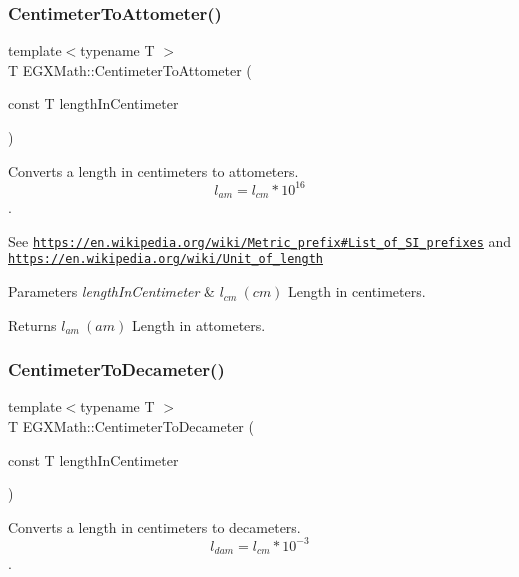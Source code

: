 \subsubsection{\texorpdfstring{Centimeter\+To\+Attometer()}{CentimeterToAttometer()}}
{\footnotesize\ttfamily template$<$typename T $>$ \\
T E\+G\+X\+Math\+::\+Centimeter\+To\+Attometer (\begin{DoxyParamCaption}\item[{const T}]{length\+In\+Centimeter }\end{DoxyParamCaption})}



Converts a length in centimeters to attometers. \[ l_{am}=l_{cm} * 10^{16} \]. 

See \href{https://en.wikipedia.org/wiki/Metric_prefix#List_of_SI_prefixes}{\tt https\+://en.\+wikipedia.\+org/wiki/\+Metric\+\_\+prefix\#\+List\+\_\+of\+\_\+\+S\+I\+\_\+prefixes} and \href{https://en.wikipedia.org/wiki/Unit_of_length}{\tt https\+://en.\+wikipedia.\+org/wiki/\+Unit\+\_\+of\+\_\+length} 
\begin{DoxyParams}{Parameters}
{\em length\+In\+Centimeter} & $ l_{cm}\ (cm)$ Length in centimeters. \\
\hline
\end{DoxyParams}
\begin{DoxyReturn}{Returns}
$ l_{am}\ (am)$ Length in attometers. 
\end{DoxyReturn}
\mbox{\label{group___e_g_x_math-_conversions-_length_conversions-_centimeter-_s_i_ga5f40a749a8759a89e5c618df3c3b7945}} 
\subsubsection{\texorpdfstring{Centimeter\+To\+Decameter()}{CentimeterToDecameter()}}
{\footnotesize\ttfamily template$<$typename T $>$ \\
T E\+G\+X\+Math\+::\+Centimeter\+To\+Decameter (\begin{DoxyParamCaption}\item[{const T}]{length\+In\+Centimeter }\end{DoxyParamCaption})}



Converts a length in centimeters to decameters. \[ l_{dam}=l_{cm} * 10^{-3} \]. 

